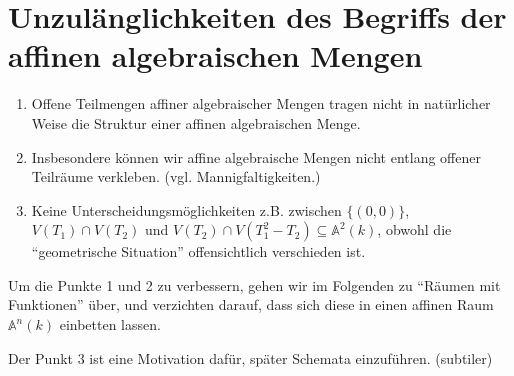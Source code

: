
\section{Unzulänglichkeiten des Begriffs der affinen algebraischen Mengen}
\label{sec:unzulaenglichkeiten-alg-mengen}
\begin{enumerate}
\item Offene Teilmengen affiner algebraischer Mengen tragen nicht in natürlicher
  Weise die Struktur einer affinen algebraischen Menge.
\item Insbesondere können wir affine algebraische Mengen nicht entlang offener
  Teilräume verkleben. (vgl. Mannigfaltigkeiten.)
\item Keine Unterscheidungsmöglichkeiten z.B. zwischen $\{(0,0)\}$, $V(T_{1})\cap V(T_{2})$
  und $V(T_{2})\cap V(T_{1}^{2}-T_{2})\subseteq\mathbb{A}^{2}(k)$,
  obwohl die ``geometrische Situation'' offensichtlich verschieden
  ist.
\end{enumerate}
Um die Punkte 1 und 2 zu verbessern, gehen wir im Folgenden zu ``Räumen mit Funktionen'' über, und verzichten darauf,
dass sich diese in einen affinen Raum $\mathbb{A}^{n}(k)$ einbetten
lassen.

Der Punkt 3 ist eine Motivation dafür, später Schemata einzuführen.
(subtiler)

